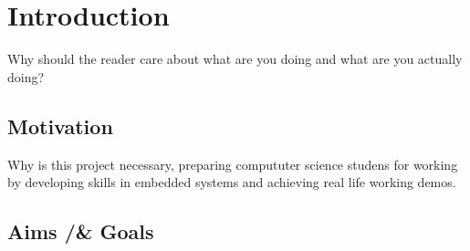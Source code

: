\documentclass{l4proj}
\begin{document}
\educationalconsent

\tableofcontents

%
%
%
%
%
%
%
%
\chapter{Introduction}



Why should the reader care about what are you doing and what are you actually doing?
\section{Motivation}

\text Why is this project necessary, preparing compututer science studens for working by developing skills in embedded systems and achieving real life working demos.

\section{Aims /& Goals}
\end{document}
